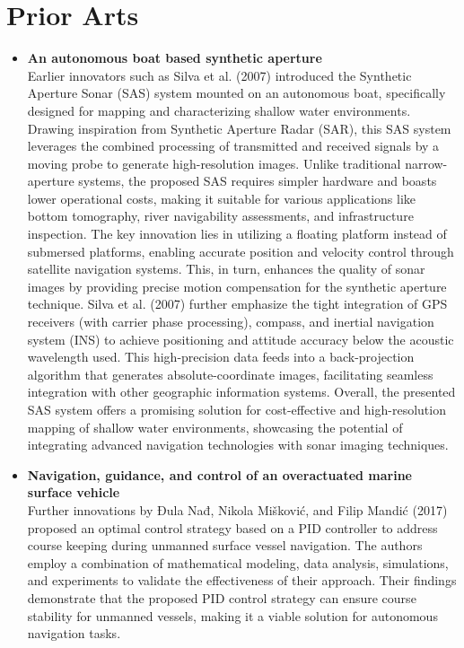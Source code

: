 \section{Prior Arts}
\begin{itemize}
\item {\bf An autonomous boat based synthetic aperture} \\
Earlier innovators such as Silva et al. (2007) introduced the Synthetic Aperture Sonar (SAS) system mounted on an 
autonomous boat, specifically designed for mapping and characterizing shallow water environments. Drawing inspiration 
from Synthetic Aperture Radar (SAR), this SAS system leverages the combined processing of transmitted and received 
signals by a moving probe to generate high-resolution images. Unlike traditional narrow-aperture systems, the proposed 
SAS requires simpler hardware and boasts lower operational costs, making it suitable for various applications like 
bottom tomography, river navigability assessments, and infrastructure inspection. The key innovation lies in utilizing 
a floating platform instead of submersed platforms, enabling accurate position and velocity control through satellite 
navigation systems. This, in turn, enhances the quality of sonar images by providing precise motion compensation for 
the synthetic aperture technique. Silva et al. (2007) further emphasize the tight integration of GPS receivers (with 
carrier phase processing), compass, and inertial navigation system (INS) to achieve positioning and attitude accuracy 
below the acoustic wavelength used. This high-precision data feeds into a back-projection algorithm that generates 
absolute-coordinate images, facilitating seamless integration with other geographic information systems. Overall, the 
presented SAS system offers a promising solution for cost-effective and high-resolution mapping of shallow water 
environments, showcasing the potential of integrating advanced navigation technologies with sonar imaging techniques.

\item {\bf Navigation, guidance, and control of an overactuated marine surface vehicle} \\
Further innovations by Đula Nađ, Nikola Mišković, and Filip Mandić (2017) proposed an optimal control strategy based on a 
PID controller to address course keeping during unmanned surface vessel navigation. The authors employ a combination 
of mathematical modeling, data analysis, simulations, and experiments to validate the effectiveness of their approach. 
Their findings demonstrate that the proposed PID control strategy can ensure course stability for unmanned vessels, 
making it a viable solution for autonomous navigation tasks.


\end{itemize}
